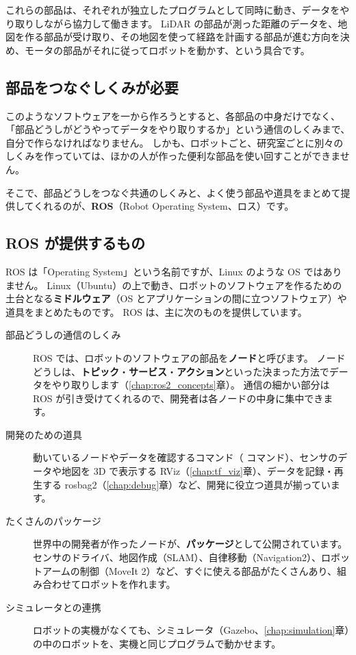 これらの部品は、それぞれが独立したプログラムとして同時に動き、データをやり取りしながら協力して働きます。
LiDAR の部品が測った距離のデータを、地図を作る部品が受け取り、その地図を使って経路を計画する部品が進む方向を決め、モータの部品がそれに従ってロボットを動かす、という具合です。

\subsection{部品をつなぐしくみが必要}

このようなソフトウェアを一から作ろうとすると、各部品の中身だけでなく、「部品どうしがどうやってデータをやり取りするか」という通信のしくみまで、自分で作らなければなりません。
しかも、ロボットごと、研究室ごとに別々のしくみを作っていては、ほかの人が作った便利な部品を使い回すことができません。

そこで、部品どうしをつなぐ共通のしくみと、よく使う部品や道具をまとめて提供してくれるのが、\textbf{ROS}（Robot Operating System、ロス）です。

\subsection{ROS が提供するもの}

ROS は「Operating System」という名前ですが、Linux のような OS ではありません。
Linux（Ubuntu）の上で動き、ロボットのソフトウェアを作るための土台となる\textbf{ミドルウェア}（OS とアプリケーションの間に立つソフトウェア）や道具をまとめたものです。
ROS は、主に次のものを提供しています。

\begin{description}
  \item[部品どうしの通信のしくみ]
    ROS では、ロボットのソフトウェアの部品を\textbf{ノード}と呼びます。
    ノードどうしは、\textbf{トピック}・\textbf{サービス}・\textbf{アクション}といった決まった方法でデータをやり取りします（\ref{chap:ros2_concepts}章）。
    通信の細かい部分は ROS が引き受けてくれるので、開発者は各ノードの中身に集中できます。
  \item[開発のための道具]
    動いているノードやデータを確認するコマンド（ コマンド）、センサのデータや地図を 3D で表示する RViz（\ref{chap:tf_viz}章）、データを記録・再生する rosbag2（\ref{chap:debug}章）など、開発に役立つ道具が揃っています。
  \item[たくさんのパッケージ]
    世界中の開発者が作ったノードが、\textbf{パッケージ}として公開されています。
    センサのドライバ、地図作成（SLAM）、自律移動（Navigation2）、ロボットアームの制御（MoveIt 2）など、すぐに使える部品がたくさんあり、組み合わせてロボットを作れます。
  \item[シミュレータとの連携]
    ロボットの実機がなくても、シミュレータ（Gazebo、\ref{chap:simulation}章）の中のロボットを、実機と同じプログラムで動かせます。
\end{description}

